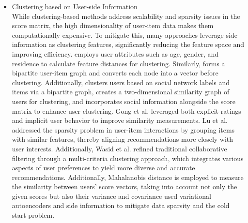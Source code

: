 \documentclass{article}
\theoremstyle{plain}
\theoremstyle{definition}
\theoremstyle{remark}
\begin{document}
\begin{itemize}
\item[b) ] Clustering based on User-side Information \\ 
While clustering-based methods address scalability and sparsity issues in the score matrix, the high dimensionality of user-item data makes them computationally expensive. To mitigate this, many approaches leverage side information as clustering features, significantly reducing the feature space and improving efficiency. \cite{liji2018improved} employs user attributes such as age, gender, and residence to calculate feature distances for clustering. Similarly, \cite{chen2019n2vscdnnr} forms a bipartite user-item graph and converts each node into a vector before clustering. Additionally, \cite{zhao2017coarse} clusters users based on social network labels and items via a bipartite graph, \cite{sheugh2018novel} creates a two-dimensional similarity graph of users for clustering, and \cite{wasid2018clustering} incorporates social information alongside the score matrix to enhance user clustering. Gong et al. \cite{gong2010collaborative} leveraged both explicit ratings and implicit user behavior to improve similarity measurements. Lu et al. \cite{lu2021novel} addressed the sparsity problem in user-item interactions by grouping items with similar features, thereby aligning recommendations more closely with user interests. Additionally, Wasid et al. \cite{wasid2018improved} refined traditional collaborative filtering through a multi-criteria clustering approach, which integrates various aspects of user preferences to yield more diverse and accurate recommendations. Additionally, Mahalanobis distance is employed to measure the similarity between users' score vectors, taking into account not only the given scores but also their variance and covariance \cite{deng2019neural} used variational autoencoders and side information to mitigate data sparsity and the cold start problem. 


\end{itemize}
\end{document}
